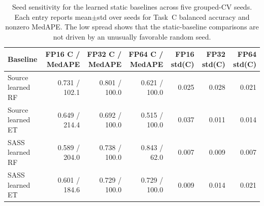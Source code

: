 \begin{table}[t]
  \centering
  \caption{Seed sensitivity for the learned static baselines across five grouped-CV seeds. Each entry reports mean$\pm$std over seeds for Task~C balanced accuracy and nonzero MedAPE. The low spread shows that the static-baseline comparisons are not driven by an unusually favorable random seed.}
  \label{tab:seed-sensitivity}
  \scriptsize
  \setlength{\tabcolsep}{4pt}
  \begin{tabular}{lrrrrrr}
    \toprule
    Baseline & FP16 C / MedAPE & FP32 C / MedAPE & FP64 C / MedAPE & FP16 std(C) & FP32 std(C) & FP64 std(C) \\
    \midrule
    Source learned RF & 0.731 / 102.1 & 0.801 / 100.0 & 0.621 / 100.0 & 0.025 & 0.028 & 0.021 \\
    Source learned ET & 0.649 / 214.4 & 0.692 / 100.0 & 0.515 / 100.0 & 0.037 & 0.011 & 0.014 \\
    SASS learned RF & 0.589 / 204.0 & 0.738 / 100.0 & 0.843 / 62.0 & 0.007 & 0.009 & 0.007 \\
    SASS learned ET & 0.601 / 184.6 & 0.729 / 100.0 & 0.729 / 100.0 & 0.009 & 0.014 & 0.021 \\
    \bottomrule
  \end{tabular}
\end{table}
